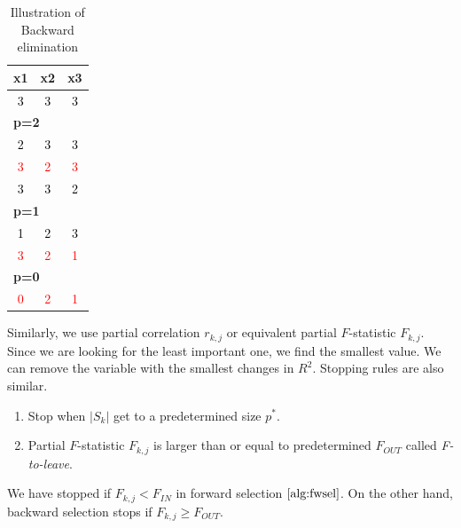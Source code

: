 \documentclass[]{book}
\providecommand{\tightlist}{%
  \setlength{\itemsep}{0pt}\setlength{\parskip}{0pt}}
\theoremstyle{definition}
\theoremstyle{definition}
\theoremstyle{definition}
\theoremstyle{remark}
\begin{document}
\begin{longtable}{c|c|c}
\caption{\label{tab:bwtab}Illustration of Backward elimination}\\
\hline
x1 & x2 & x3\\
\hline
\textcolor{black}{3} & \textcolor{black}{3} & \textcolor{black}{3}\\
\hline
\multicolumn{3}{l}{\textbf{p=2}}\\
\hline
\hspace{1em}\textcolor{black}{2} & \textcolor{black}{3} & \textcolor{black}{3}\\
\hline
\hspace{1em}\textcolor{red}{3} & \textcolor{red}{2} & \textcolor{red}{3}\\
\hline
\hspace{1em}\textcolor{black}{3} & \textcolor{black}{3} & \textcolor{black}{2}\\
\hline
\multicolumn{3}{l}{\textbf{p=1}}\\
\hline
\hspace{1em}\textcolor{black}{1} & \textcolor{black}{2} & \textcolor{black}{3}\\
\hline
\hspace{1em}\textcolor{red}{3} & \textcolor{red}{2} & \textcolor{red}{1}\\
\hline
\multicolumn{3}{l}{\textbf{p=0}}\\
\hline
\hspace{1em}\textcolor{red}{0} & \textcolor{red}{2} & \textcolor{red}{1}\\
\hline
\end{longtable}

Similarly, we use partial correlation \(r_{k,j}\) or equivalent partial \(F\)-statistic \(F_{k,j}\). Since we are looking for the least important one, we find the smallest value. We can remove the variable with the smallest changes in \(R^2\). Stopping rules are also similar.

\begin{enumerate}
\def\labelenumi{\arabic{enumi}.}
\tightlist
\item
  Stop when \(\lvert S_k \rvert\) get to a predetermined size \(p^{\ast}\).
\item
  Partial \(F\)-statistic \(F_{k,j}\) is larger than or equal to predetermined \(F_{OUT}\) called \emph{F-to-leave}.
\end{enumerate}

We have stopped if \(F_{k,j} < F_{IN}\) in forward selection \(\ref{alg:fwsel}\). On the other hand, backward selection stops if \(F_{k,j} \ge F_{OUT}\).
\end{document}
